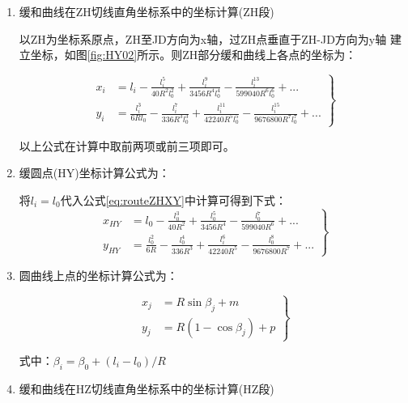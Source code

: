 \begin{enumerate}

\item  缓和曲线在ZH切线直角坐标系中的坐标计算(ZH段)

以ZH为坐标系原点，ZH至JD方向为x轴，过ZH点垂直于ZH-JD方向为y轴
建立坐标，如图\ref{fig:HY02}所示。则ZH部分缓和曲线上各点的坐标为：

\begin{equation}
\left .
\begin{aligned}
x_i &= l_i - \frac{l^5_i}{40R^2 l^2_0} + \frac{l^9_i}{3456R^4 l^4_0}
           - \frac{l^{13}_i}{599040R^6l^6_0} + ...  \\
y_i &=  \frac{l^3_i}{6Rl_0} - \frac{l^7_i}{336R^3 l^3_0}
    + \frac{l^{11}_i}{42240R^5l^5_0} -\frac{l^{15}_i}{9676800R^7l^7_0}+ ...
\end{aligned}
\right \}
\label{eq:routeZHXY}
\end{equation}

以上公式在计算中取前两项或前三项即可。

\item  缓圆点(HY)坐标计算公式为：

将$l_i = l_0$代入公式\ref{eq:routeZHXY}中计算可得到下式：
\begin{equation}
\left . \begin{aligned}
x_{HY} &= l_0 - \frac{l^3_0}{40R^2} + \frac{l^5_0}{3456R^4}
          - \frac{l^{7}_0}{599040R^6} + ...  \\
y_{HY} &=  \frac{l^2_0}{6R} - \frac{l^4_0}{336R^3}
          + \frac{l^{6}_i}{42240R^5} -\frac{l^{8}_0}{9676800R^7}+ ...
\end{aligned} \right \}
\label{eq:routeHY}
\end{equation}

\item  圆曲线上点的坐标计算公式为：

\begin{equation}
\left . \begin{aligned}
x_{j} &= R \sin \beta_j + m \\
y_{j} &= R(1- \cos \beta_j) +p
\end{aligned} \right \}
\label{eq:routeYQXY}
\end{equation}

式中：$\beta_i = \beta_0 + (l_i - l_0)/R$

\item  缓和曲线在HZ切线直角坐标系中的坐标计算(HZ段)


\end{enumerate}
